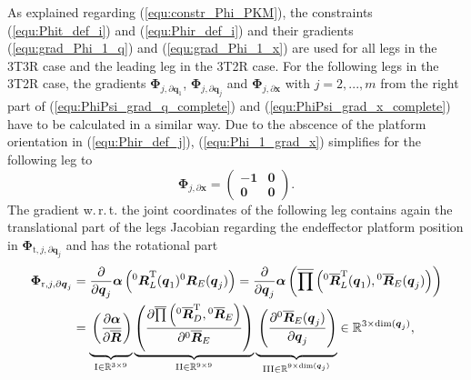 \documentclass[robotics,article,submit,moreauthors,pdftex]{Definitions/mdpi}
\newcommand{\bm}[1]{\boldsymbol{#1}}
\newcommand{\rotmat}[2]{{{ }^{#1}\boldsymbol{R}}_{#2}}
\newcommand{\rotmato}[2]{{{ }^{#1}\boldsymbol{\overline{R}}}_{#2}}
\newcommand{\transp}[0]{{\mathrm{T}}}
\begin{document}
As explained regarding (\ref{equ:constr_Phi_PKM}), the constraints (\ref{equ:Phit_def_i}) and (\ref{equ:Phir_def_i}) and their gradients (\ref{equ:grad_Phi_1_q}) and (\ref{equ:grad_Phi_1_x}) are used for all legs in the 3T3R case and the leading leg in the 3T2R case.
For the following legs in the 3T2R case, the gradients $\bm{\Phi}_{j,\partial\bm{q}_1}$, $\bm{\Phi}_{j,\partial\bm{q}_j}$ and $\bm{\Phi}_{j,\partial\bm{x}}$ with $j=2,...,m$ from the right part of  (\ref{equ:PhiPsi_grad_q_complete}) and (\ref{equ:PhiPsi_grad_x_complete}) have to be calculated in a similar way. 
Due to the abscence of the platform orientation in (\ref{equ:Phir_def_j}), (\ref{equ:Phi_1_grad_x}) simplifies for the following leg to 
%
\begin{equation}
\bm{\Phi}_{j,\partial\bm{x}}
=
\begin{pmatrix}
-\bm{1} & \bm{0} \\
\bm{0} & \bm{0}
\end{pmatrix}.
\end{equation}
%
The gradient w.\,r.\,t. the joint coordinates of the following leg contains again the translational part of the legs Jacobian regarding the endeffector platform position in $\bm{\Phi}_{\mathrm{t},j,\partial\bm{q}_j}$ and has the rotational part
%
\begin{align}
\bm{\Phi}_{\mathrm{r},j,\partial\bm{q}_j}
&=
\frac{\partial}{\partial \bm{q}_j} \bm{\alpha}\left(\rotmat{0}{L}^\transp(\bm{q}_1) \rotmat{0}{E}(\bm{q}_j)\right)
=
\frac{\partial}{\partial \bm{q}_j} \bm{\alpha}\left(\overline{\prod}\left( \rotmato{0}{L}^\transp(\bm{q}_1), \rotmato{0}{E}(\bm{q}_j)\right)\right)  \label{equ:grad_Phi_j_qj}\\
&=
\underbrace{\vphantom{\left(\frac{\partial \overline{\prod}\left(\rotmato{0}{D}^\transp, \rotmato{0}{E}\right)}{\partial \rotmato{0}{E}}\right)}\left(\frac{\partial \bm{\alpha}}{\partial \overline{\bm{R}}}\right)}_{\mathrm{I} \in {\mathbb{R}}^{3 \times 9}}
\underbrace{\left(\frac{\partial \overline{\prod}\left(\rotmato{0}{D}^\transp, \rotmato{0}{E}\right)}{\partial \rotmato{0}{E}}\right)}_{\mathrm{II} \in {\mathbb{R}}^{9 \times 9}}
\underbrace{\vphantom{\left(\frac{\partial \overline{\prod}\left(\rotmato{0}{L}^\transp, \rotmato{0}{E}\right)}{\partial \rotmato{0}{E}}\right)}\left(\frac{\partial \rotmato{0}{E}(\bm{q}_j)}{\partial \bm{q}_j} \right)}_{\mathrm{III} \in {\mathbb{R}}^{9 \times \mathrm{dim}(\bm{q}_j)}}
\in {\mathbb{R}}^{3 \times \mathrm{dim}(\bm{q}_j)}, \nonumber
\end{align}
\end{document}
